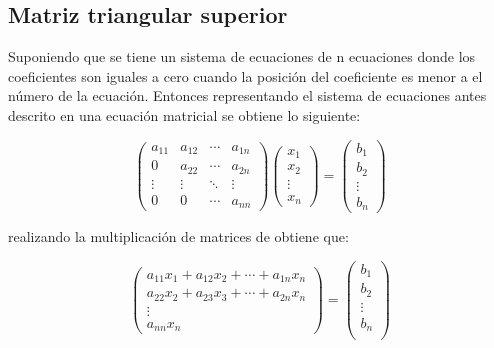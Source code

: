 \subsection{Matriz triangular superior}

Suponiendo que se tiene un sistema de ecuaciones de n ecuaciones donde los coeficientes son
iguales a cero cuando la posición del coeficiente es menor a el número de la ecuación. Entonces representando el sistema de ecuaciones antes descrito en una ecuación matricial se obtiene lo siguiente:

\begin{equation*}
    \begin{pmatrix}
        a_{11} & a_{12} & \cdots & a_{1n} \\
        0      & a_{22} & \cdots & a_{2n} \\
        \vdots & \vdots & \ddots & \vdots \\
        0      & 0      & \cdots & a_{nn}
    \end{pmatrix}
    \begin{pmatrix}
        x_1    \\
        x_2    \\
        \vdots \\
        x_n
    \end{pmatrix} =
    \begin{pmatrix}
        b_1    \\
        b_2    \\
        \vdots \\
        b_n
    \end{pmatrix}
\end{equation*}

realizando la multiplicación de matrices de obtiene que:

\begin{equation*}
    \begin{pmatrix}
        a_{11}x_{1}+a_{12}x_{2}+\cdots+a_{1n}x_n \\
        a_{22}x_{2}+a_{23}x_{3}+\cdots+a_{2n}x_n \\
        \vdots                                   \\
        a_{nn}x_{n}
    \end{pmatrix} =
    \begin{pmatrix}
        b_1    \\
        b_2    \\
        \vdots \\
        b_n    \\
    \end{pmatrix}
\end{equation*}

